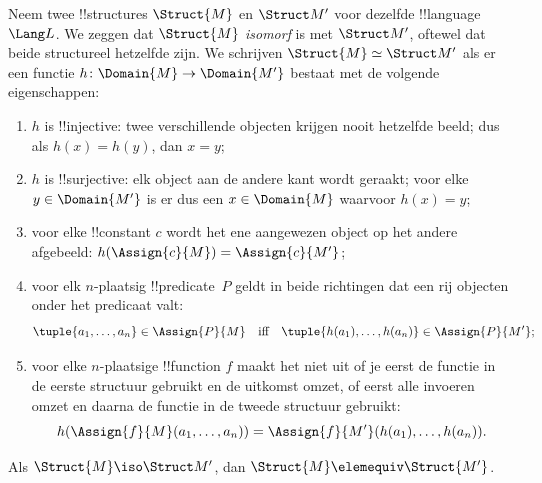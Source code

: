 \documentclass[openany]{memoir}
\begin{document}
\begin{defn}
 Neem twee !!{structure}s $\Struct{M}$ en
$\Struct M'$ voor dezelfde !!{language}~$\Lang L$. We zeggen dat
$\Struct{M}$ \emph{isomorf} is met $\Struct M'$, oftewel dat beide
structureel hetzelfde zijn. We schrijven $\Struct{M}
\simeq \Struct M'$ als er een functie $h \colon
\Domain{M} \to \Domain{M'}$ bestaat met de volgende eigenschappen:
\begin{enumerate}
\item $h$ is !!{injective}: twee verschillende objecten krijgen nooit
  hetzelfde beeld; dus als $h(x) = h(y)$, dan $x = y$; 
\item $h$ is !!{surjective}: elk object aan de andere kant wordt geraakt;
  voor elke $y \in \Domain{M'}$ is er dus een $x \in \Domain{M}$ waarvoor
  $h(x) = y$;
\item {}voor elke !!{constant} $c$ wordt het ene
  aangewezen object op het andere afgebeeld:
  $h(\Assign{c}{M}) = \Assign{c}{M'}$;
\item {}voor elk $n$-plaatsig !!{predicate}~$P$
  geldt in beide richtingen dat een rij objecten onder het predicaat valt:
  \[
  \tuple{a_1, \dots, a_n}\in \Assign{P}{M} \quad\text{iff}\quad
  \tuple{h(a_1), \dots, h(a_n)} \in \Assign{P}{M'};
  \]
\item {}voor elke $n$-plaatsige !!{function} $f$
  maakt het niet uit of je eerst de functie in de eerste structuur
  gebruikt en de uitkomst omzet, of eerst alle invoeren omzet en daarna
  de functie in de tweede structuur gebruikt:
  \[
  h(\Assign{f}{M}(a_1, \dots, a_n)) =
  \Assign{f}{M'}(h(a_1), \dots, h(a_n)).
  \]
\end{enumerate}
\end{defn}

\begin{thm}
Als $\Struct{M} \iso \Struct M'$, dan $\Struct{M} \elemequiv
\Struct{M'}$.
\end{thm}
\end{document}
